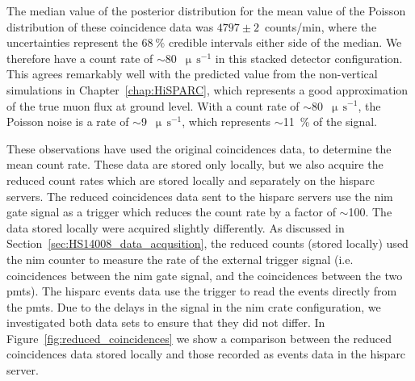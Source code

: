 %
%


The median value of the posterior distribution for the mean value of the Poisson distribution of these coincidence data was $4797\pm2$~counts/min, where the uncertainties represent the $68~\%$ credible intervals either side of the median. We therefore have a count rate of $\sim$80~$\upmu \, \mathrm{s}^{-1}$ in this stacked detector configuration. This agrees remarkably well with the predicted value from the non-vertical simulations in Chapter~\ref{chap:HiSPARC}, which represents a good approximation of the true muon flux at ground level. With a count rate of $\sim$80~$\upmu \, \mathrm{s}^{-1}$, the Poisson noise is a rate of $\sim$9~$\upmu \, \mathrm{s}^{-1}$, which represents $\sim$11~\% of the signal.


These observations have used the original coincidences data, to determine the mean count rate. These data are stored only locally, but we also acquire the reduced count rates which are stored locally and separately on the \gls{hisparc} servers. The reduced coincidences data sent to the \gls{hisparc} servers use the \gls{nim} gate signal as a trigger which reduces the count rate by a factor of $\sim$100. The data stored locally were acquired slightly differently. As discussed in Section~\ref{sec:HS14008_data_acqusition}, the reduced counts (stored locally) used the \gls{nim} counter to measure the rate of the external trigger signal (i.e. coincidences between the \gls{nim} gate signal, and the coincidences between the two \glspl{pmt}). The \gls{hisparc} events data use the trigger to read the events directly from the \glspl{pmt}. Due to the delays in the signal in the \gls{nim} crate configuration, we investigated both data sets to ensure that they did not differ. In Figure~\ref{fig:reduced_coincidences} we show a comparison between the reduced coincidences data stored locally and those recorded as events data in the \gls{hisparc} server.


